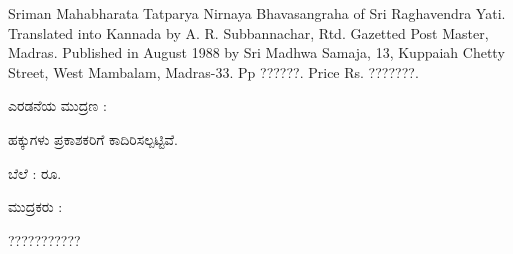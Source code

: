 \thispagestyle{empty}

\noindent
Sriman Mahabharata Tatparya Nirnaya Bhavasangraha of Sri Raghavendra Yati. Translated into Kannada by A. R. Subbannachar, Rtd. Gazetted Post Master, Madras. Published in August 1988 by Sri Madhwa Samaja, 13, Kuppaiah Chetty Street, West Mambalam, Madras-33. Pp ??????. Price Rs. ???????.



{
\begin{center}

ಎರಡನೆಯ ಮುದ್ರಣ : 

\vfill

ಹಕ್ಕುಗಳು ಪ್ರಕಾಶಕರಿಗೆ ಕಾದಿರಿಸಲ್ಪಟ್ಟಿವೆ. 

\vfill

ಬೆಲೆ : ರೂ. 

\vfill

ಮುದ್ರಕರು :

???????????

\end{center}

}
